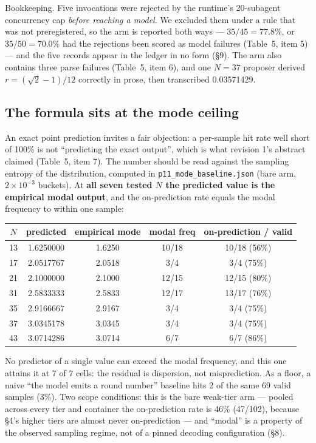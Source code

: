 \documentclass[11pt]{article}
\begin{document}
Bookkeeping. Five invocations were rejected by the runtime's 20-subagent concurrency cap
\textit{before reaching a model}. We excluded them under a rule that was not preregistered, so the arm
is reported both ways --- $35/45 = 77.8\%$, or $35/50 = 70.0\%$ had the rejections been scored as model
failures (Table~5, item 5) --- and the five records appear in the ledger in no form (\S9). The arm
also contains three parse failures (Table~5, item 6), and one $N = 37$ proposer derived
$r = (\sqrt{2}-1)/12$ correctly in prose, then transcribed 0.03571429.

\subsection{The formula sits at the mode ceiling}

An exact point prediction invites a fair objection: a per-sample hit rate well short of 100\% is
not ``predicting the exact output'', which is what revision 1's abstract claimed (Table~5, item
7). The number should be read against the sampling entropy of the distribution, computed in
\texttt{p11\_mode\_baseline.json} (bare arm, $2\times10^{-3}$ buckets). At \textbf{all seven tested $N$ the predicted
value is the empirical modal output}, and the on-prediction rate equals the modal frequency to
within one sample:

\begin{center}
\begin{tabular}{ccccc}
\toprule
$N$ & predicted & empirical mode & modal freq & on-prediction / valid \\
\midrule
13 & 1.6250000 & 1.6250 & 10/18 & 10/18 (56\%) \\
17 & 2.0517767 & 2.0518 & 3/4   & 3/4 (75\%) \\
21 & 2.1000000 & 2.1000 & 12/15 & 12/15 (80\%) \\
31 & 2.5833333 & 2.5833 & 12/17 & 13/17 (76\%) \\
35 & 2.9166667 & 2.9167 & 3/4   & 3/4 (75\%) \\
37 & 3.0345178 & 3.0345 & 3/4   & 3/4 (75\%) \\
43 & 3.0714286 & 3.0714 & 6/7   & 6/7 (86\%) \\
\bottomrule
\end{tabular}
\end{center}

No predictor of a single value can exceed the modal frequency, and this one attains it at 7 of
7 cells: the residual is dispersion, not misprediction. As a floor, a naive ``the model emits a
round number'' baseline hits 2 of the same 69 valid samples (3\%). Two scope conditions: this is
the bare weak-tier arm --- pooled across every tier and container the on-prediction rate is 46\%
(47/102), because \S4's higher tiers are almost never on-prediction --- and ``modal'' is a property
of the observed sampling regime, not of a pinned decoding configuration (\S8).
\end{document}
